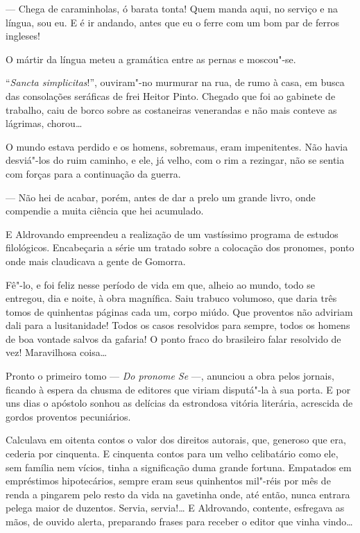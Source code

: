 --- Chega de caraminholas, ó barata tonta! Quem manda aqui, no serviço e
na língua, sou eu. E é ir andando, antes que eu o ferre com um bom par
de ferros ingleses!

O mártir da língua meteu a gramática entre as pernas e moscou"-se.

``\emph{Sancta simplicitas}!'', ouviram"-no murmurar na rua, de rumo à
casa, em busca das consolações seráficas de frei Heitor Pinto. Chegado
que foi ao gabinete de trabalho, caiu de borco sobre as costaneiras
venerandas e não mais conteve as lágrimas, chorou\ldots{}

O mundo estava perdido e os homens, sobremaus, eram impenitentes. Não
havia desviá"-los do ruim caminho, e ele, já velho, com o rim a rezingar,
não se sentia com forças para a continuação da guerra.

--- Não hei de acabar, porém, antes de dar a prelo um grande livro, onde
compendie a muita ciência que hei acumulado.

E Aldrovando empreendeu a realização de um vastíssimo programa de
estudos filológicos. Encabeçaria a série um tratado sobre a colocação
dos pronomes, ponto onde mais claudicava a gente de Gomorra.

Fê"-lo, e foi feliz nesse período de vida em que, alheio ao mundo, todo
se entregou, dia e noite, à obra magnífica. Saiu trabuco volumoso, que
daria três tomos de quinhentas páginas cada um, corpo miúdo. Que
proventos não adviriam dali para a lusitanidade! Todos os casos
resolvidos para sempre, todos os homens de boa vontade salvos da
gafaria! O ponto fraco do brasileiro falar resolvido de vez! Maravilhosa
coisa\ldots{}

Pronto o primeiro tomo --- \emph{Do pronome Se} ---, anunciou a obra
pelos jornais, ficando à espera da chusma de editores que viriam
disputá"-la à sua porta. E por uns dias o apóstolo sonhou as delícias da
estrondosa vitória literária, acrescida de gordos proventos pecuniários.

Calculava em oitenta contos o valor dos direitos autorais, que, generoso
que era, cederia por cinquenta. E cinquenta contos para um velho
celibatário como ele, sem família nem vícios, tinha a significação duma
grande fortuna. Empatados em empréstimos hipotecários, sempre eram seus
quinhentos mil"-réis por mês de renda a pingarem pelo resto da vida na
gavetinha onde, até então, nunca entrara pelega maior de duzentos.
Servia, servia!\ldots{} E Aldrovando, contente, esfregava as mãos, de ouvido
alerta, preparando frases para receber o editor que vinha vindo\ldots{}

